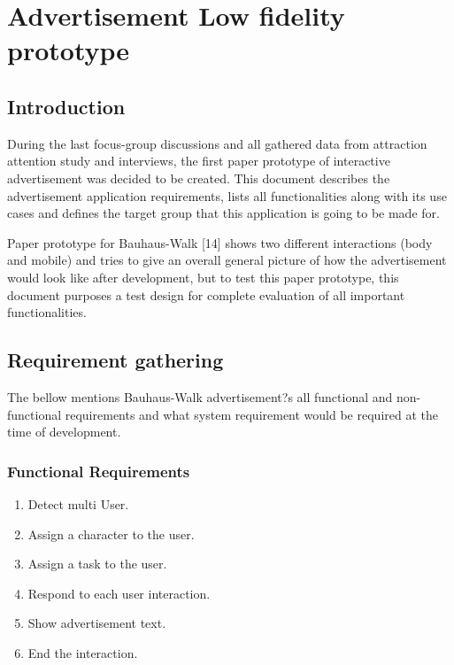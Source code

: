 \chapter{Advertisement Low fidelity prototype} %

\label{Chapter5} %

\section{Introduction}
During the last focus-group discussions and all gathered data from attraction attention study and interviews, the first paper prototype of interactive advertisement was decided to be created. This document describes the advertisement application requirements, lists all functionalities along with its use cases and defines the target group that this application is going to be made for. 

Paper prototype for Bauhaus-Walk [14] shows two different interactions (body and mobile) and tries to give an overall general picture of how the advertisement would look like after development, but to test this paper prototype, this document purposes a test design for complete evaluation of all important functionalities.

\newpage
\section{Requirement gathering}

The bellow mentions Bauhaus-Walk advertisement?s all functional and non-functional requirements and what system requirement would be required at the time of development.

\subsection{Functional Requirements}

\begin{enumerate}
\item	Detect multi User.
\item	Assign a character to the user. 
\item	Assign a task to the user.
\item	Respond to each user interaction.
\item	Show advertisement text.
\item	End the interaction.
\end{enumerate}



